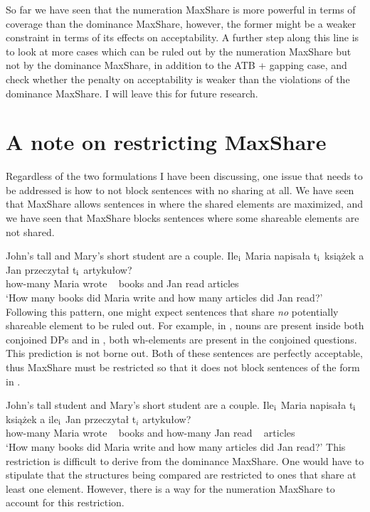 \documentclass[output=paper]{langscibook}
\begin{document}
So far we have seen that the numeration MaxShare is more powerful in terms of coverage than the dominance MaxShare, however, the former might be a weaker constraint in terms of its effects on acceptability. A further step along this line is to look at more cases which can be ruled out by the numeration MaxShare but not by the dominance MaxShare, in addition to the ATB + gapping case, and check whether the penalty on acceptability is weaker than the violations of the dominance MaxShare. I will leave this for future research.

\section{A note on restricting MaxShare}
\label{shensect:restrict}

Regardless of the two formulations I have been discussing, one issue that needs to be addressed is how to not block sentences with no sharing at all. We have seen that MaxShare allows sentences in  where the shared elements are maximized, and we have seen that MaxShare blocks sentences where some shareable elements are not shared. 

\ea
	\label{shenex20}
	\ea 
		John's tall and Mary's short student are a couple.
	\ex 
		\gll Ile$_{\textnormal{i}}$ Maria napisała t$_{\textnormal{i}}$ ksią\.z{}ek a Jan przeczytał t$_{\textnormal{i}}$ artykułow?\\
		how-many Maria wrote {~} books and Jan read {} articles\\
		\glt `How many books did Maria write and how many articles did Jan read?'
	\z 
\z 
Following this pattern, one might expect sentences that share \textit{no} potentially shareable element to be ruled out. For example, in , nouns are present inside both conjoined DPs and in , both wh-elements are present in the conjoined questions. This prediction is not borne out. Both of these sentences are perfectly acceptable, thus MaxShare must be restricted so that it does not block sentences of the form in . 
 
\ea 
	\label{shenex21}
	\ea 
		\label{shenex21:a}
		John's tall student and Mary's short student are a couple.
	\ex 
		\label{shenex21:b}
		\gll Ile$_{\textnormal{i}}$ Maria napisała t$_{\textnormal{i}}$ ksią\.z{}ek a ile$_{\textnormal{i}}$  Jan przeczytał t$_i$ artykułow? \\
		how-many Maria wrote {~} books and how-many Jan read {~} articles\\
		\glt `How many books did Maria write and how many articles did Jan read?'
	\z 
\z 
This restriction is difficult to derive from the dominance MaxShare. One would have to stipulate that the structures being compared are restricted to ones that share at least one element. However, there is a way for the numeration MaxShare to account for this restriction. 
\end{document}

